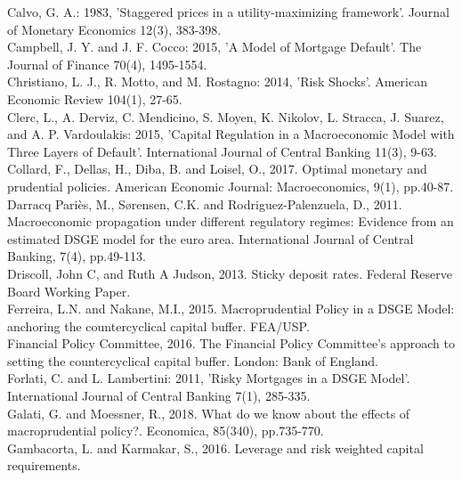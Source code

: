 \documentclass[12pt]{article}
\numberwithin{equation}{section}
\begin{document}
Calvo, G. A.: 1983, 'Staggered prices in a utility-maximizing framework'. Journal of Monetary Economics 12(3), 383-398.\\

Campbell, J. Y. and J. F. Cocco: 2015, 'A Model of Mortgage Default'. The Journal of Finance 70(4), 1495-1554.\\

Christiano, L. J., R. Motto, and M. Rostagno: 2014, 'Risk Shocks'. American Economic Review 104(1), 27-65.\\

Clerc, L., A. Derviz, C. Mendicino, S. Moyen, K. Nikolov, L. Stracca, J. Suarez, and A. P. Vardoulakis: 2015, 'Capital Regulation in a Macroeconomic Model with Three Layers of Default'. International Journal of Central Banking 11(3), 9-63.\\

Collard, F., Dellas, H., Diba, B. and Loisel, O., 2017. Optimal monetary and prudential policies. American Economic Journal: Macroeconomics, 9(1), pp.40-87. \\

Darracq Pariès, M., Sørensen, C.K. and Rodriguez-Palenzuela, D., 2011. Macroeconomic propagation under different regulatory regimes: Evidence from an estimated DSGE model for the euro area. International Journal of Central Banking, 7(4), pp.49-113. \\

Driscoll, John C, and Ruth A Judson, 2013. Sticky deposit rates. Federal Reserve Board
Working Paper.\\

Ferreira, L.N. and Nakane, M.I., 2015. Macroprudential Policy in a DSGE Model: anchoring the countercyclical capital buffer. FEA/USP. \\

Financial Policy Committee, 2016. The Financial Policy Committee’s approach to setting the countercyclical capital buffer. London: Bank of England. \\

Forlati, C. and L. Lambertini: 2011, 'Risky Mortgages in a DSGE Model'. International Journal of Central Banking 7(1), 285-335.\\

Galati, G. and Moessner, R., 2018. What do we know about the effects of macroprudential policy?. Economica, 85(340), pp.735-770.\\

Gambacorta, L. and Karmakar, S., 2016. Leverage and risk weighted capital requirements.\\
\end{document}
